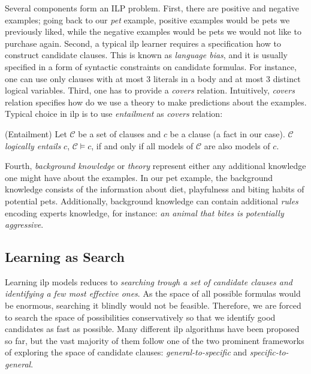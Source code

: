 Several components form an ILP problem.
First, there are positive and negative examples; going back to our \textit{pet} example, positive examples would be pets we previously liked, while the negative examples would be pets we would not like to purchase again.
Second, a typical \gls{ilp} learner requires a specification how to construct candidate clauses.
This is known as \textit{language bias}, and it is usually specified in a form of syntactic constraints on candidate formulas.
For instance, one can use only clauses with at most 3 literals in a body and at most 3 distinct logical variables.
Third, one has to provide a \textit{covers} relation.
Intuitively, \textit{covers} relation specifies how do we use a theory to make predictions about the examples.
Typical choice in \gls{ilp} is to use \textit{entailment} as \textit{covers} relation:

\begin{definition}{(Entailment)}
	Let $\mathcal{C}$ be a set of clauses and $c$ be a clause (a fact in our case). $\mathcal{C}$ \textit{logically entails} $c$, $\mathcal{C} \models c$, if and only if all models of $\mathcal{C}$ are also models of $c$. 
\end{definition}
Fourth, \textit{background knowledge} or \textit{theory} represent either any additional knowledge one might have about the examples.
In our pet example, the background knowledge consists of the information about diet, playfulness and biting habits of potential pets.
Additionally, background knowledge can contain additional \textit{rules} encoding experts knowledge, for instance: \textit{an animal that bites is potentially aggressive}.




\subsection{Learning as Search}

Learning \gls{ilp} models reduces to \textit{searching trough a set of candidate clauses and identifying a few most effective ones}.
As the space of all possible formulas would be enormous, searching it blindly would not be feasible.
Therefore, we are forced to search the space of possibilities conservatively so that we identify good candidates as fast as possible.
Many different \gls{ilp} algorithms have been proposed so far, but the vast majority of them follow one of the two prominent frameworks of exploring the space of candidate clauses: \textit{general-to-specific} and \textit{specific-to-general}.



